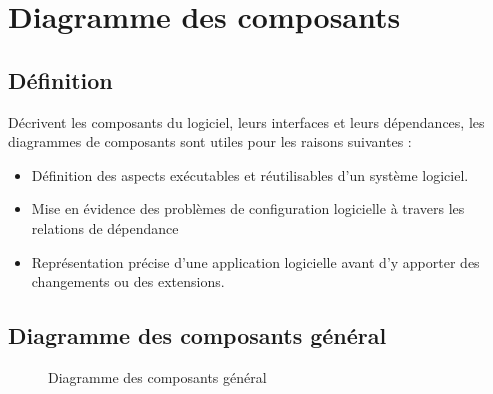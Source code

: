 \documentclass[12pt]{report}
\begin{document}
\newpage

\section{Diagramme des composants}
\subsection{Définition}
\hspace*{0.16in}
Décrivent les composants du logiciel, leurs interfaces et leurs dépendances, les diagrammes de composants sont utiles pour les raisons suivantes :

\begin{itemize}
    \item Définition des aspects exécutables et réutilisables d'un système logiciel.
    \item Mise en évidence des problèmes de configuration logicielle à travers les relations de dépendance
    \item Représentation précise d'une application logicielle avant d'y apporter des changements ou des extensions.
\end{itemize}

\subsection{Diagramme des composants général}

\begin{figure}[h]
\centering
  \vspace{-0.1in}
    \centerline{}
    \caption{Diagramme des composants général}
\end{figure}
\end{document}
